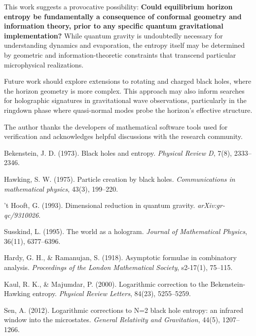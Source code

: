 \documentclass[12pt, letterpaper]{article}
\begin{document}
This work suggests a provocative possibility: \textbf{Could equilibrium horizon entropy be fundamentally a consequence of conformal geometry and information theory, prior to any specific quantum gravitational implementation?} While quantum gravity is undoubtedly necessary for understanding dynamics and evaporation, the entropy itself may be determined by geometric and information-theoretic constraints that transcend particular microphysical realizations.

Future work should explore extensions to rotating and charged black holes, where the horizon geometry is more complex. This approach may also inform searches for holographic signatures in gravitational wave observations, particularly in the ringdown phase where quasi-normal modes probe the horizon's effective structure.

\begin{acknowledgments}
The author thanks the developers of mathematical software tools used for verification and acknowledges helpful discussions with the research community.
\end{acknowledgments}


\begin{thebibliography}{9}

Bekenstein, J. D. (1973). Black holes and entropy. \textit{Physical Review D}, 7(8), 2333–2346.

Hawking, S. W. (1975). Particle creation by black holes. \textit{Communications in mathematical physics}, 43(3), 199–220.

't Hooft, G. (1993). Dimensional reduction in quantum gravity. \textit{arXiv:gr-qc/9310026}.

Susskind, L. (1995). The world as a hologram. \textit{Journal of Mathematical Physics}, 36(11), 6377–6396.

Hardy, G. H., \& Ramanujan, S. (1918). Asymptotic formulae in combinatory analysis. \textit{Proceedings of the London Mathematical Society}, s2-17(1), 75–115.

Kaul, R. K., \& Majumdar, P. (2000). Logarithmic correction to the Bekenstein-Hawking entropy. \textit{Physical Review Letters}, 84(23), 5255–5259.

Sen, A. (2012). Logarithmic corrections to N=2 black hole entropy: an infrared window into the microstates. \textit{General Relativity and Gravitation}, 44(5), 1207–1266.

\end{thebibliography}
\end{document}

